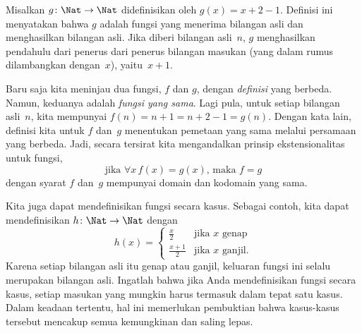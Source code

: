 \documentclass[../../../include/open-logic-section]{subfiles}
\begin{document}
\begin{ex}
Misalkan $g \colon \Nat \to \Nat$ didefinisikan oleh $g(x) = x+2-1$.
Definisi ini menyatakan bahwa $g$ adalah fungsi yang menerima bilangan asli dan
menghasilkan bilangan asli. Jika diberi bilangan asli~$n$, $g$ menghasilkan
pendahulu dari penerus dari penerus bilangan masukan (yang dalam rumus
dilambangkan dengan~$x$), yaitu~$x+1$.
\end{ex}

\begin{explain}
Baru saja kita meninjau dua fungsi, $f$ dan $g$, dengan \emph{definisi} yang
berbeda. Namun, keduanya adalah \emph{fungsi yang sama}. Lagi pula, untuk
setiap bilangan asli~$n$, kita mempunyai $f(n) = n+1 = n+2-1 = g(n)$. Dengan
kata lain, definisi kita untuk $f$ dan~$g$ menentukan pemetaan yang sama melalui
persamaan yang berbeda. Jadi, secara tersirat kita mengandalkan prinsip
ekstensionalitas untuk fungsi,
\[
  \text{jika }\forall x\, f(x) = g(x)\text{, maka }f = g
\]
dengan syarat $f$ dan~$g$ mempunyai domain dan kodomain yang sama.
\end{explain}

\begin{ex}
Kita juga dapat mendefinisikan fungsi secara kasus. Sebagai contoh, kita dapat
mendefinisikan $h \colon \Nat \to \Nat$ dengan
\[
h(x) =
\begin{cases}
  \frac{x}{2} & \text{jika $x$ genap} \\
  \frac{x+1}{2} & \text{jika $x$ ganjil.}
\end{cases}
\]
Karena setiap bilangan asli itu genap atau ganjil, keluaran fungsi ini selalu
merupakan bilangan asli. Ingatlah bahwa jika Anda mendefinisikan fungsi secara
kasus, setiap masukan yang mungkin harus termasuk dalam tepat satu kasus.
Dalam keadaan tertentu, hal ini memerlukan pembuktian bahwa kasus-kasus
tersebut mencakup semua kemungkinan dan saling lepas.
\end{ex}
\end{document}
